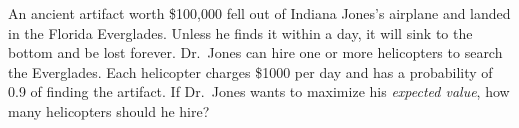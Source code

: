 \documentclass[addpoints,12pt]{exam}
\begin{document}
\begin{questions}
  \question An ancient artifact worth \$100,000 fell out of Indiana Jones's airplane and landed in the Florida Everglades. Unless he finds it within a day, it will sink to the bottom and be lost forever. Dr.\ Jones can hire one or more helicopters to search the Everglades. Each helicopter charges \$1000 per day and has a probability of 0.9 of finding the artifact. If Dr.\ Jones wants to maximize his \emph{expected value}, how many helicopters should he hire?



\end{questions}
\end{document}
